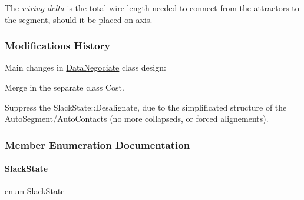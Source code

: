  The {\itshape wiring delta} is the total wire length needed to connect from the attractors to the segment, should it be placed on {\ttfamily axis}.

\hypertarget{classKite_1_1DataNegociate_secDataNegociateModifications}{}\subsubsection{Modifications History}\label{classKite_1_1DataNegociate_secDataNegociateModifications}
Main changes in \mbox{\hyperlink{classKite_1_1DataNegociate}{Data\+Negociate}} class design\+:
\begin{DoxyItemize}
\item Merge in the separate class {\ttfamily Cost}.
\item Suppress the {\ttfamily Slack\+State\+::\+Desalignate}, due to the simplificated structure of the Auto\+Segment/\+Auto\+Contacts (no more collapseds, or forced alignements). 
\end{DoxyItemize}

\subsubsection{Member Enumeration Documentation}
\mbox{\label{classKite_1_1DataNegociate_ab7ccb6fc1f298728995250a3bbcf18c7}} 
\paragraph{\texorpdfstring{Slack\+State}{SlackState}}
{\footnotesize\ttfamily enum \mbox{\hyperlink{classKite_1_1DataNegociate_ab7ccb6fc1f298728995250a3bbcf18c7}{Slack\+State}}}


